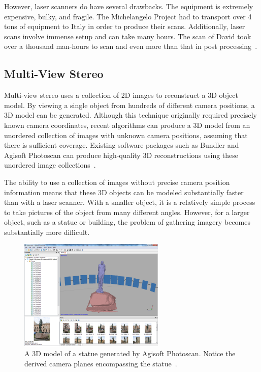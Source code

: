 However, laser scanners do have several drawbacks. The equipment is extremely expensive, bulky, and fragile. The Michelangelo Project had to transport over 4 tons of equipment to Italy in order to produce their scans. Additionally, laser scans involve immense setup and can take many hours. The scan of David took over a thousand man-hours to scan and even more than that in post processing~\cite{Levoy}.

\subsection{Multi-View Stereo}
Multi-view stereo uses a collection of 2D images to reconstruct a 3D object model. By viewing a single object from hundreds of different camera positions, a 3D model can be generated. Although this technique originally required precisely known camera coordinates, recent algorithms can produce a 3D model from an unordered collection of images with unknown camera positions, assuming that there is sufficient coverage. Existing software packages such as Bundler and Agisoft Photoscan can produce high-quality 3D reconstructions using these unordered image collections~\cite{bundler, Agisoft}.

The ability to use a collection of images without precise camera position information means that these 3D objects can be modeled substantially faster than with a laser scanner. With a smaller object, it is a relatively simple process to take pictures of the object from many different angles. However, for a larger object, such as a statue or building, the problem of gathering imagery becomes substantially more difficult.

\begin{figure}
\centering
\includegraphics[height=200px]{../images/photoscan.png}
\caption{A 3D model of a statue generated by Agisoft Photoscan. Notice the derived camera planes encompassing the statue~\cite{Agisoft}.}
\end{figure}

